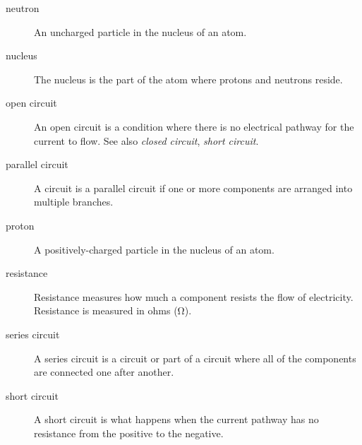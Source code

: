 \begin{description}
\item[neutron] An uncharged particle in the nucleus of an atom.
\item[nucleus] The nucleus is the part of the atom where protons and neutrons reside. 
\item[open circuit] An open circuit is a condition where there is no electrical pathway for the current to flow.  See also \emph{closed circuit}, \emph{short circuit}.
\item[parallel circuit] A circuit is a parallel circuit if one or more components are arranged into multiple branches.
\item[proton] A positively-charged particle in the nucleus of an atom.
\item[resistance] Resistance measures how much a component resists the flow of electricity.  Resistance is measured in ohms (\si{\ohm}).
\item[series circuit] A series circuit is a circuit or part of a circuit where all of the components are connected one after another.
\item[short circuit] A short circuit is what happens when the current pathway has no resistance from the positive to the negative.
\end{description}
